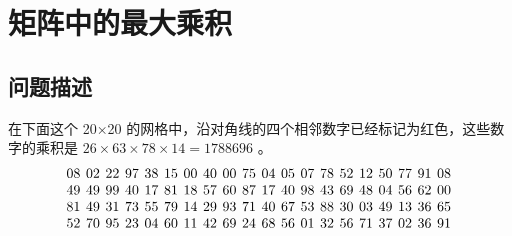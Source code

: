 \section{矩阵中的最大乘积}
\subsection{问题描述}
\begin{tcolorbox}
	在下面这个 20×20 的网格中，沿对角线的四个相邻数字已经标记为红色，这些数字的乘积是 \(  26 \times 63 \times 78 \times 14 = 1788696 \) 。
	\begin{equation*}
		\begin{array}{@{\hspace{4pt}}c@{\hspace{4pt}}c@{\hspace{4pt}}c@{\hspace{4pt}}c@{\hspace{4pt}}c@{\hspace{4pt}}c@{\hspace{4pt}}c@{\hspace{4pt}}c@{\hspace{4pt}}c@{\hspace{4pt}}c@{\hspace{4pt}}c@{\hspace{4pt}}c@{\hspace{4pt}}c@{\hspace{4pt}}c@{\hspace{4pt}}c@{\hspace{4pt}}c@{\hspace{4pt}}c@{\hspace{4pt}}c@{\hspace{4pt}}c@{\hspace{4pt}}c}
			08 & 02 & 22 & 97 & 38 & 15 & 00 & 40 & 00                  & 75                  & 04                  & 05                  & 07 & 78 & 52 & 12 & 50 & 77 & 91 & 08 \\
			49 & 49 & 99 & 40 & 17 & 81 & 18 & 57 & 60                  & 87                  & 17                  & 40                  & 98 & 43 & 69 & 48 & 04 & 56 & 62 & 00 \\
			81 & 49 & 31 & 73 & 55 & 79 & 14 & 29 & 93                  & 71                  & 40                  & 67                  & 53 & 88 & 30 & 03 & 49 & 13 & 36 & 65 \\
			52 & 70 & 95 & 23 & 04 & 60 & 11 & 42 & 69                  & 24                  & 68                  & 56                  & 01 & 32 & 56 & 71 & 37 & 02 & 36 & 91 \\

\end{array}
\end{equation*}
\end{tcolorbox}
